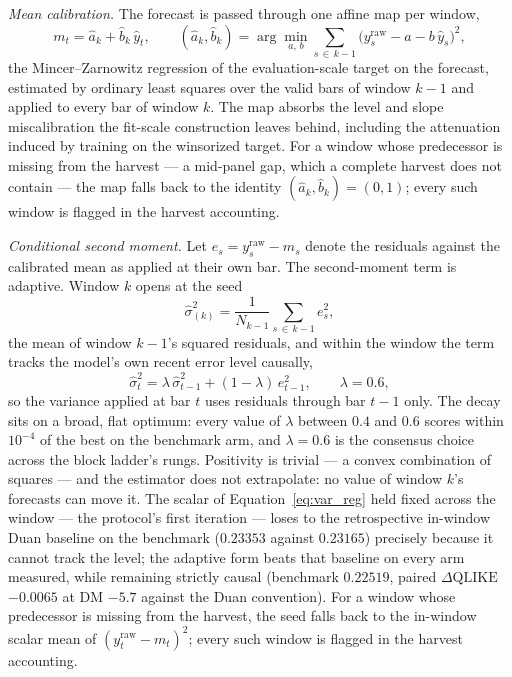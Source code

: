 \emph{Mean calibration.} The forecast is passed through one affine map per
window,
\begin{equation}
    m_t = \hat{a}_k + \hat{b}_k\, \hat{y}_t,
    \qquad
    (\hat{a}_k, \hat{b}_k)
    = \arg\min_{a,\, b} \sum_{s \,\in\, k-1}
      \bigl(y^{\mathrm{raw}}_s - a - b\,\hat{y}_s\bigr)^2,
    \label{eq:mean_calib}
\end{equation}
the Mincer--Zarnowitz regression of the evaluation-scale target on the
forecast, estimated by ordinary least squares over the valid bars of
window $k-1$ and applied to every bar of window $k$. The map absorbs the
level and slope miscalibration the fit-scale construction leaves behind,
including the attenuation induced by training on the winsorized target.
For a window whose predecessor is missing from the harvest --- a
mid-panel gap, which a complete harvest does not contain --- the map
falls back to the identity $(\hat{a}_k, \hat{b}_k) = (0, 1)$; every such
window is flagged in the harvest accounting.

\emph{Conditional second moment.} Let
$e_s = y^{\mathrm{raw}}_s - m_s$ denote the residuals against the
calibrated mean as applied at their own bar. The second-moment term is
adaptive. Window $k$ opens at the seed
\begin{equation}
    \hat{\sigma}^2_{(k)}
    = \frac{1}{N_{k-1}} \sum_{s \,\in\, k-1} e_s^2,
    \label{eq:var_reg}
\end{equation}
the mean of window $k-1$'s squared residuals, and within the window the
term tracks the model's own recent error level causally,
\begin{equation}
    \hat{\sigma}^2_t
    = \lambda\, \hat{\sigma}^2_{t-1} + (1 - \lambda)\, e_{t-1}^2,
    \qquad \lambda = 0.6,
    \label{eq:var_ewma}
\end{equation}
so the variance applied at bar $t$ uses residuals through bar $t-1$
only. The decay sits on a broad, flat optimum: every value of $\lambda$
between $0.4$ and $0.6$ scores within $10^{-4}$ of the best on the
benchmark arm, and $\lambda = 0.6$ is the consensus choice across the
block ladder's rungs. Positivity is trivial --- a convex combination of
squares --- and the estimator does not extrapolate: no value of window
$k$'s forecasts can move it. The scalar of
Equation~\eqref{eq:var_reg} held fixed across the window --- the protocol's first iteration --- loses to the retrospective in-window Duan
baseline on the benchmark ($0.23353$ against $0.23165$) precisely
because it cannot track the level; the adaptive form beats that
baseline on every arm measured, while remaining strictly causal
(benchmark $0.22519$, paired $\Delta\mathrm{QLIKE}$ $-0.0065$ at DM
$-5.7$ against the Duan convention). For a window whose predecessor is
missing from the harvest, the seed falls back to the in-window scalar
mean of $(y^{\mathrm{raw}}_t - m_t)^2$; every such window is flagged in
the harvest accounting.

